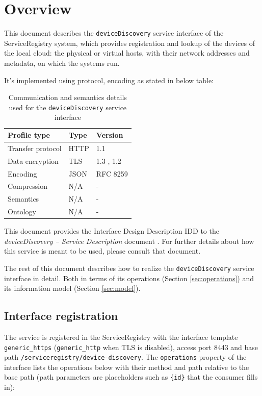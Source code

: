 \documentclass[a4paper]{arrowhead}
\begin{document}
\section{Overview}
\label{sec:overview}

This document describes the \texttt{deviceDiscovery} service interface of the ServiceRegistry system, which provides registration and lookup of the devices of the local cloud: the physical or virtual hosts, with their network addresses and metadata, on which the systems run.

It's implemented using protocol, encoding as stated in below table:
\begin{table}[ht!]
  \centering
  \begin{tabular}{|l|l|l|}
    \hline
    \rowcolor{gray!33} Profile type & Type & Version \\ \hline
    Transfer protocol & HTTP & 1.1 \cite{rfc9112} \\ \hline
    Data encryption & TLS & 1.3 \cite{rfc8446}, 1.2 \cite{rfc5246} \\ \hline
    Encoding & JSON & RFC 8259 \cite{rfc8259} \\ \hline
    Compression & N/A & - \\ \hline
    Semantics & N/A & - \\ \hline
    Ontology & N/A & - \\ \hline
  \end{tabular}
  \caption{Communication and semantics details used for the \texttt{deviceDiscovery} service interface}
  \label{tab:comunication_semantics_profile}
\end{table}

This document provides the Interface Design Description IDD to the \textit{deviceDiscovery -- Service Description} document \cite{sr-deviceDiscovery-sd}.
For further details about how this service is meant to be used, please consult that document.

The rest of this document describes how to realize the \texttt{deviceDiscovery} service
interface in detail. Both in terms of its operations (Section \ref{sec:operations}) and its information model (Section \ref{sec:model}).

\subsection{Interface registration}

The service is registered in the ServiceRegistry with the interface template \texttt{generic\_\allowbreak{}https} (\texttt{generic\_\allowbreak{}http} when TLS is disabled), access port 8443 and base path \texttt{/\allowbreak{}serviceregistry/\allowbreak{}device-\allowbreak{}discovery}. The \texttt{operations} property of the interface lists the operations below with their method and path relative to the base path (path parameters are placeholders such as \texttt{\{id\}} that the consumer fills in):
\end{document}
